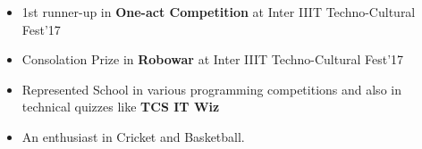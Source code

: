 
\begin{itemize}
	\item 1st  runner-up in \textbf{One-act Competition} at Inter IIIT Techno-Cultural Fest’17
	\item Consolation Prize in \textbf{Robowar} at Inter IIIT Techno-Cultural Fest’17
	\item Represented School in various programming competitions and also in technical quizzes like \textbf{TCS IT Wiz}
	\item An enthusiast in Cricket and Basketball.
\end{itemize}